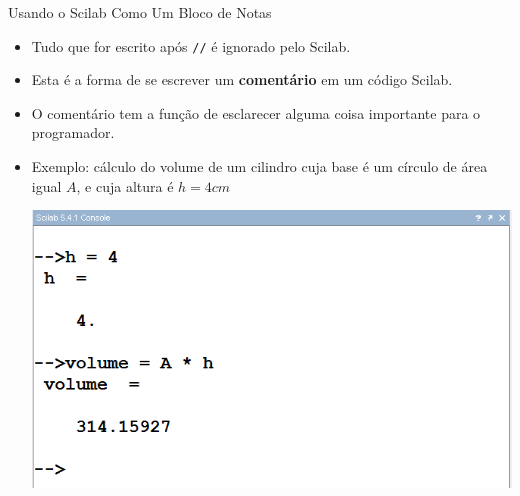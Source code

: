 \begin{frame}{Usando o Scilab Como Um Bloco de Notas}
\begin{itemize}
    \item Tudo que for escrito após \texttt{//} é \alert{ignorado} pelo
    Scilab.
    \item Esta é a forma de se escrever um \textbf{comentário} em um
    código Scilab.
    \item O comentário tem a função de \alert{esclarecer} alguma coisa
    importante para o programador.
    \item Exemplo: cálculo do volume de um cilindro cuja base é um
    círculo de área igual $A$, e cuja altura é $h = 4cm$
    \begin{center}
      \includegraphics[scale=0.4]{images/volume.png}
    \end{center}
  \end{itemize}
\end{frame}

